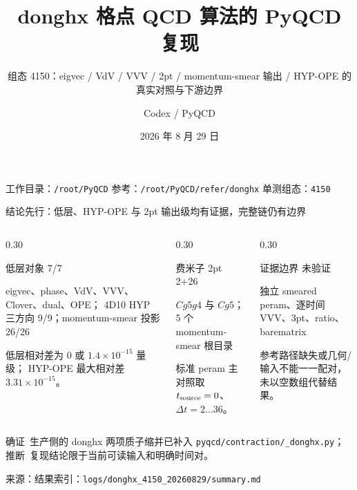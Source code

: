 \documentclass[UTF8,aspectratio=169,11pt]{ctexbeamer}
\title[4150 donghx 复现]{donghx 格点 QCD 算法的 PyQCD 复现}
\subtitle{组态 4150：eigvec / VdV / VVV / 2pt / momentum-smear 输出 / HYP-OPE 的真实对照与下游边界}
\author[Codex]{Codex / PyQCD}
\institute{格点 QCD：蒸馏、质子相关函数与胶子算符}
\date{2026 年 8 月 29 日}
\newcommand{\source}[1]{\vspace{0.05em}\par{\raggedright\scriptsize\color{muted}来源：#1\par}}
\newcommand{\codepath}[1]{\nolinkurl{#1}}
\newcommand{\verified}{\textcolor{evidence}{确证}}
\newcommand{\inferred}{\textcolor{accent}{推断}}
\begin{document}
\begin{frame}[plain]
  \titlepage
  \vfill
  \begin{center}
    \small 工作目录：\codepath{/root/PyQCD}\quad
    参考：\codepath{/root/PyQCD/refer/donghx}\quad
    单测组态：\texttt{4150}
  \end{center}
\end{frame}

\begin{frame}[t]{结论先行：低层、HYP-OPE 与 2pt 输出级均有证据，完整链仍有边界}
  \begin{columns}[T,totalwidth=\textwidth]
    \begin{column}{0.30\textwidth}
      \begin{block}{低层对象}
        \centering\Large\textcolor{evidence}{7/7}\par\normalsize
        eigvec、phase、VdV、VVV、Clover、dual、OPE；\newline
        4D10 HYP 三方向 9/9；momentum-smear 投影 26/26
      \end{block}
    \footnotesize 低层相对差为 $0$ 或 $1.4\times10^{-15}$ 量级；\newline
    HYP-OPE 最大相对差 $3.31\times10^{-15}$。
    \end{column}
    \begin{column}{0.30\textwidth}
      \begin{block}{费米子 2pt}
        \centering\Large\textcolor{evidence}{2+26}\par\normalsize
        $Cg5g4$ 与 $Cg5$；5 个 momentum-smear 根目录
      \end{block}
      \footnotesize 标准 peram 主对照取 $t_{\rm source}=0$、$\Delta t=2\ldots36$。
    \end{column}
    \begin{column}{0.30\textwidth}
      \begin{block}{证据边界}
        \centering\Large\textcolor{warning}{未验证}\par\normalsize
        独立 smeared peram、逐时间 VVV、3pt、ratio、barematrix
      \end{block}
      \small 参考路径缺失或几何/输入不能一一配对，未以空数组代替结果。
    \end{column}
  \end{columns}
  \vfill
  \colorbox{good}{\parbox{0.94\linewidth}{\centering
    \verified\ 生产侧的 donghx 两项质子缩并已补入 \codepath{pyqcd/contraction/_donghx.py}；
    \inferred\ 复现结论限于当前可读输入和明确时间对。}}
  \vspace{-0.18em}
  \source{结果索引：\codepath{logs/donghx_4150_20260829/summary.md}}
\end{frame}
\end{document}
